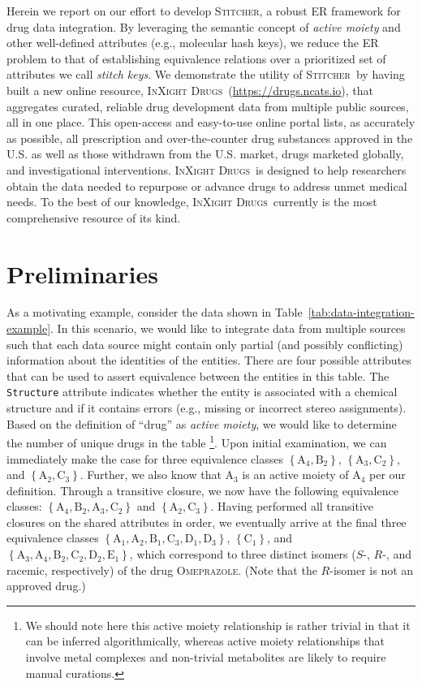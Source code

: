 \documentclass{bmcart}
\newcommand\st{\textsc{Stitcher}}
\newcommand\ix{\textsc{InXight Drugs}}
\begin{document}
Herein we report on our effort to develop \st, a robust ER framework
for drug data integration. By leveraging the semantic concept of
\emph{active moiety} and other well-defined attributes (e.g.,
molecular hash keys), we reduce the ER problem to that of establishing
equivalence relations over a prioritized set of attributes we call
\emph{stitch keys}. We demonstrate the utility of \st\ by having built 
a new online resource, \ix\ (\url{https://drugs.ncats.io}), that aggregates curated, reliable 
drug development data from multiple public sources, all in one place. 
This open-access and easy-to-use online portal lists, as accurately as possible, 
all prescription and over-the-counter drug substances approved in the U.S. 
as well as those withdrawn from the U.S. market, drugs marketed globally, 
and investigational interventions. \ix\ is designed to help researchers 
obtain the data needed to repurpose or advance drugs to address unmet medical needs.
To the best of our knowledge, \ix\ currently is the most comprehensive resource of its kind.

\section*{Preliminaries}
As a motivating example, consider the data shown in
Table~\ref{tab:data-integration-example}. In this scenario, we would like 
to integrate data from multiple sources such that each data source 
might contain only partial (and possibly conflicting) information about the identities of the
entities. There are four possible attributes that can be used to assert
equivalence between the entities in this table. The \verb|Structure| attribute 
indicates whether the entity is associated with a chemical structure 
and if it contains errors (e.g., missing or incorrect stereo assignments). 
Based on the definition of ``drug'' as \emph{active moiety}, we would like to determine the number of
unique drugs in the table 
\footnote{\footnotesize{We should note here
this active moiety relationship is rather trivial in that it can
be inferred algorithmically, whereas active moiety relationships that
involve metal complexes and non-trivial metabolites are likely to
require manual curations.}}.
Upon initial examination, we can
immediately make the case for three equivalence classes $\left\{\textrm{A}_4,
\textrm{B}_2\right\}$, $\left\{\textrm{A}_3, \textrm{C}_2\right\}$,
and $\left\{\textrm{A}_2, \textrm{C}_3\right\}$. Further, we also know that
$\textrm{A}_3$ is an active moiety of $\textrm{A}_4$ per our
definition. Through a transitive closure, we now have the following
equivalence classes: $\left\{\textrm{A}_4, 
\textrm{B}_2, \textrm{A}_3, \textrm{C}_2\right\}$ and
$\left\{\textrm{A}_2,  \textrm{C}_3\right\}$. Having performed all transitive closures on
the shared attributes in order, we eventually arrive at the final three
equivalence classes $\left\{\textrm{A}_1, \textrm{A}_2, \textrm{B}_1,
\textrm{C}_3, \textrm{D}_1, \textrm{D}_3\right\}$,
$\left\{\textrm{C}_1\right\}$, and $\left\{\textrm{A}_3, \textrm{A}_4,
\textrm{B}_2, \textrm{C}_2, \textrm{D}_2, \textrm{E}_1\right\}$, which
correspond to three distinct isomers ($S$-, $R$-, and racemic,
respectively) of the drug \textsc{Omeprazole}. (Note that the
$R$-isomer is not an approved drug.)
\end{document}
